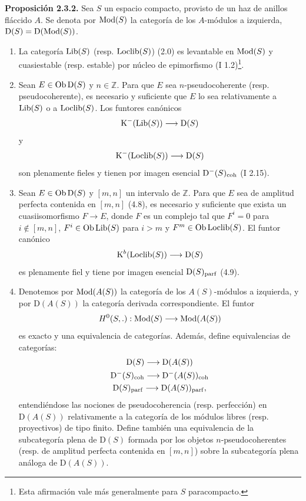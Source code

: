\textbf{Proposición 2.3.2.} Sea $S$ un espacio compacto, provisto de un haz de anillos fláccido $A$. Se denota por $\operatorname{Mod}(S)$ la categoría de los $A$-módulos a izquierda, $\mathrm D(S)=\mathrm D(\operatorname{Mod}(S))$.
\begin{enumerate}[label=\alph*)]
\item La categoría $\operatorname{Lib}(S)$ (resp. $\operatorname{Loclib}(S)$) (2.0) es levantable en $\operatorname{Mod}(S)$ y cuasiestable (resp. estable) por núcleo de epimorfismo (I 1.2)\footnote{Esta afirmación vale más generalmente para $S$ paracompacto.}.
\item Sean $E\in\operatorname{Ob}\mathrm D(S)$ y $n\in\mathbb Z$. Para que $E$ sea $n$-pseudocoherente (resp. pseudocoherente), es necesario y suficiente que $E$ lo sea relativamente a $\operatorname{Lib}(S)$ o a $\operatorname{Loclib}(S)$. Los funtores canónicos
\[
\mathrm K^{-}(\operatorname{Lib}(S))\longrightarrow \mathrm D(S)
\]
y
\[
\mathrm K^{-}(\operatorname{Loclib}(S))\longrightarrow \mathrm D(S)
\]
son plenamente fieles y tienen por imagen esencial $\mathrm D^{-}(S)_{\mathrm{coh}}$ (I 2.15).
\item Sean $E\in\operatorname{Ob}\mathrm D(S)$ y $[m,n]$ un intervalo de $\mathbb Z$. Para que $E$ sea de amplitud perfecta contenida en $[m,n]$ (4.8), es necesario y suficiente que exista un cuasiisomorfismo $F\to E$, donde $F$ es un complejo tal que $F^i=0$ para $i\notin[m,n]$, $F^i\in\operatorname{Ob}\operatorname{Lib}(S)$ para $i>m$ y $F^m\in\operatorname{Ob}\operatorname{Loclib}(S)$. El funtor canónico
\[
\mathrm K^b(\operatorname{Loclib}(S))\longrightarrow\mathrm D(S)
\]
es plenamente fiel y tiene por imagen esencial $\mathrm D(S)_{\mathrm{parf}}$ (4.9).
\item Denotemos por $\operatorname{Mod}(A(S))$ la categoría de los $A(S)$-módulos a izquierda, y por $\mathrm D(A(S))$ la categoría derivada correspondiente. El funtor
\[
H^0(S,.):\operatorname{Mod}(S)\longrightarrow\operatorname{Mod}(A(S))
\]
es exacto y una equivalencia de categorías. Además, define equivalencias de categorías:
\[
\begin{gathered}
\mathrm D(S)\longrightarrow\mathrm D(A(S))\\
\mathrm D^{-}(S)_{\mathrm{coh}}\longrightarrow\mathrm D^{-}(A(S))_{\mathrm{coh}}\\
\mathrm D(S)_{\mathrm{parf}}\longrightarrow\mathrm D(A(S))_{\mathrm{parf}},
\end{gathered}
\]
entendiéndose las nociones de pseudocoherencia (resp. perfección) en $\mathrm D(A(S))$ relativamente a la categoría de los módulos libres (resp. proyectivos) de tipo finito. Define también una equivalencia de la subcategoría plena de $\mathrm D(S)$ formada por los objetos $n$-pseudocoherentes (resp. de amplitud perfecta contenida en $[m,n]$) sobre la subcategoría plena análoga de $\mathrm D(A(S))$.
\end{enumerate}

